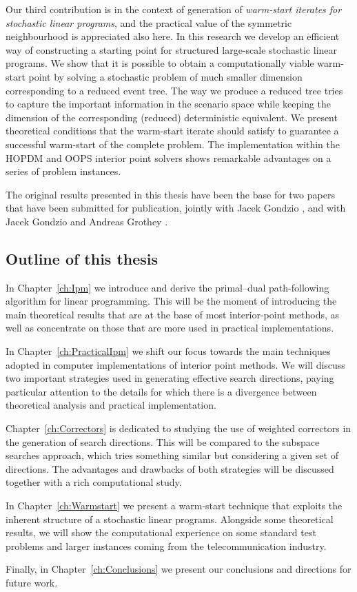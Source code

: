 Our third contribution is in the context of generation of 
{\em warm-start iterates for stochastic linear programs}, 
and the practical value of the 
symmetric neighbourhood is appreciated also here.
In this research we develop an
efficient way of constructing a starting point for structured 
large-scale stochastic linear programs.
We show that it is possible to obtain a computationally viable
warm-start point by solving a stochastic problem of much smaller
dimension corresponding to a reduced event tree.
The way we produce a reduced tree tries to capture the 
important information in the scenario space while keeping 
the dimension of the corresponding (reduced) deterministic equivalent. 
We present theoretical conditions that the warm-start iterate
should satisfy to guarantee a successful warm-start of the complete 
problem. 
The implementation within the HOPDM and OOPS interior point solvers 
shows remarkable advantages on a series of problem instances.

The original results presented in this thesis have been the base for two
papers that have been submitted for publication, jointly with
Jacek Gondzio \cite{ColomboGondzio05}, and with Jacek Gondzio and 
Andreas Grothey \cite{ColomboGondzioGrothey06}.

%
%
\subsection{Outline of this thesis}

In Chapter~\ref{ch:Ipm} we introduce and derive the primal--dual
path-following algorithm for linear programming. This will be
the moment of introducing the main theoretical results that are at
the base of most interior-point methods, as well as concentrate
on those that are more used in practical implementations.

In Chapter~\ref{ch:PracticalIpm} we shift our focus towards 
the main techniques adopted in computer implementations of
interior point methods.
We will discuss two important strategies used in generating
effective search directions, paying particular attention
to the details for which there is a divergence between theoretical
analysis and practical implementation.

Chapter~\ref{ch:Correctors} is dedicated to studying the use of
weighted correctors in the generation of search directions. This will
be compared to the subspace searches approach, which tries something
similar but considering a given set of directions. The advantages
and drawbacks of both strategies will be discussed together with
a rich computational study.

In Chapter~\ref{ch:Warmstart} we present a warm-start technique
that exploits the inherent structure of a stochastic linear programs.
Alongside some theoretical results, we will show the computational
experience on some standard test problems and larger instances coming
from the telecommunication industry.

Finally, in Chapter~\ref{ch:Conclusions} we present our conclusions
and directions for future work.
